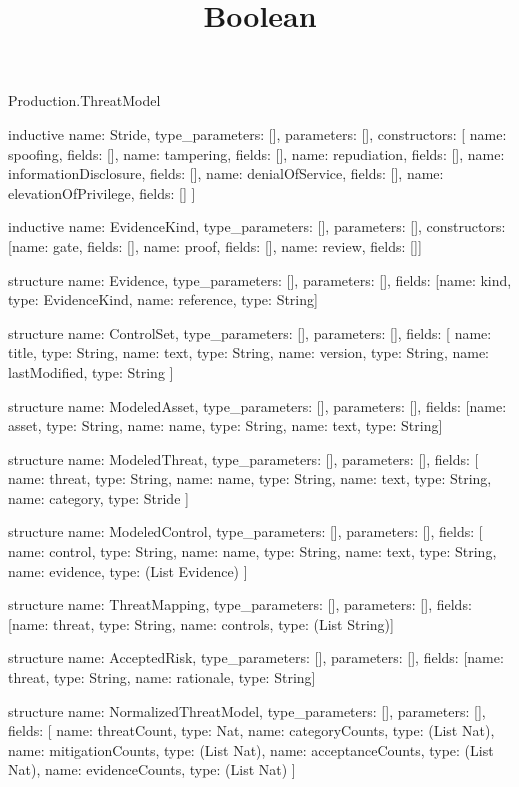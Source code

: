 \begin{lexlean}{Production.ThreatModel}
\title{Boolean}
\begin{semanticmodule}
inductive{
  name: Stride,
  type_parameters: [],
  parameters: [],
  constructors: [
    {name: spoofing, fields: []},
    {name: tampering, fields: []},
    {name: repudiation, fields: []},
    {name: informationDisclosure, fields: []},
    {name: denialOfService, fields: []},
    {name: elevationOfPrivilege, fields: []}
  ]
}

inductive{
  name: EvidenceKind,
  type_parameters: [],
  parameters: [],
  constructors: [{name: gate, fields: []}, {name: proof, fields: []}, {name: review, fields: []}]
}

structure{
  name: Evidence,
  type_parameters: [],
  parameters: [],
  fields: [{name: kind, type: EvidenceKind}, {name: reference, type: String}]
}

structure{
  name: ControlSet,
  type_parameters: [],
  parameters: [],
  fields: [
    {name: title, type: String},
    {name: text, type: String},
    {name: version, type: String},
    {name: lastModified, type: String}
  ]
}

structure{
  name: ModeledAsset,
  type_parameters: [],
  parameters: [],
  fields: [{name: asset, type: String}, {name: name, type: String}, {name: text, type: String}]
}

structure{
  name: ModeledThreat,
  type_parameters: [],
  parameters: [],
  fields: [
    {name: threat, type: String},
    {name: name, type: String},
    {name: text, type: String},
    {name: category, type: Stride}
  ]
}

structure{
  name: ModeledControl,
  type_parameters: [],
  parameters: [],
  fields: [
    {name: control, type: String},
    {name: name, type: String},
    {name: text, type: String},
    {name: evidence, type: (List Evidence)}
  ]
}

structure{
  name: ThreatMapping,
  type_parameters: [],
  parameters: [],
  fields: [{name: threat, type: String}, {name: controls, type: (List String)}]
}

structure{
  name: AcceptedRisk,
  type_parameters: [],
  parameters: [],
  fields: [{name: threat, type: String}, {name: rationale, type: String}]
}

structure{
  name: NormalizedThreatModel,
  type_parameters: [],
  parameters: [],
  fields: [
    {name: threatCount, type: Nat},
    {name: categoryCounts, type: (List Nat)},
    {name: mitigationCounts, type: (List Nat)},
    {name: acceptanceCounts, type: (List Nat)},
    {name: evidenceCounts, type: (List Nat)}
  ]
}


\end{semanticmodule}
\end{lexlean}
